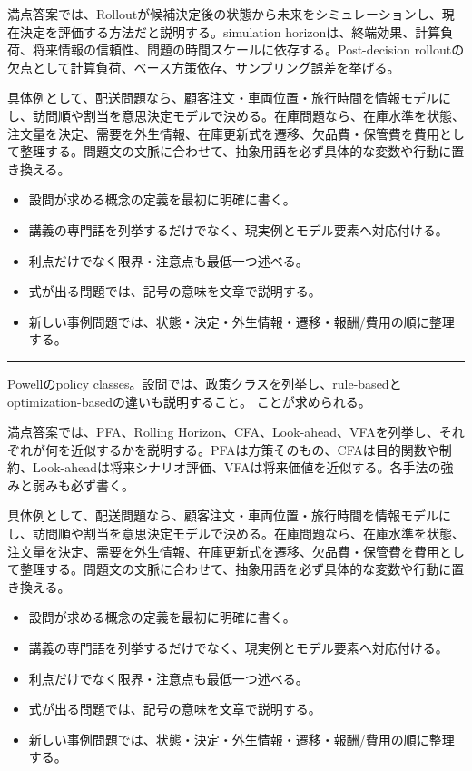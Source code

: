 満点答案では、Rolloutが候補決定後の状態から未来をシミュレーションし、現在決定を評価する方法だと説明する。simulation horizonは、終端効果、計算負荷、将来情報の信頼性、問題の時間スケールに依存する。Post-decision rolloutの欠点として計算負荷、ベース方策依存、サンプリング誤差を挙げる。\par
{}
具体例として、配送問題なら、顧客注文・車両位置・旅行時間を情報モデルにし、訪問順や割当を意思決定モデルで決める。在庫問題なら、在庫水準を状態、注文量を決定、需要を外生情報、在庫更新式を遷移、欠品費・保管費を費用として整理する。問題文の文脈に合わせて、抽象用語を必ず具体的な変数や行動に置き換える。\par
{}
\begin{itemize}
\item 設問が求める概念の定義を最初に明確に書く。
\item 講義の専門語を列挙するだけでなく、現実例とモデル要素へ対応付ける。
\item 利点だけでなく限界・注意点も最低一つ述べる。
\item 式が出る問題では、記号の意味を文章で説明する。
\item 新しい事例問題では、状態・決定・外生情報・遷移・報酬/費用の順に整理する。
\end{itemize}
\vspace{2mm}\hrule\vspace{2mm}
Powellのpolicy classes。設問では、政策クラスを列挙し、rule-basedとoptimization-basedの違いも説明すること。 ことが求められる。\par
{}
満点答案では、PFA、Rolling Horizon、CFA、Look-ahead、VFAを列挙し、それぞれが何を近似するかを説明する。PFAは方策そのもの、CFAは目的関数や制約、Look-aheadは将来シナリオ評価、VFAは将来価値を近似する。各手法の強みと弱みも必ず書く。\par
{}
具体例として、配送問題なら、顧客注文・車両位置・旅行時間を情報モデルにし、訪問順や割当を意思決定モデルで決める。在庫問題なら、在庫水準を状態、注文量を決定、需要を外生情報、在庫更新式を遷移、欠品費・保管費を費用として整理する。問題文の文脈に合わせて、抽象用語を必ず具体的な変数や行動に置き換える。\par
{}
\begin{itemize}
\item 設問が求める概念の定義を最初に明確に書く。
\item 講義の専門語を列挙するだけでなく、現実例とモデル要素へ対応付ける。
\item 利点だけでなく限界・注意点も最低一つ述べる。
\item 式が出る問題では、記号の意味を文章で説明する。
\item 新しい事例問題では、状態・決定・外生情報・遷移・報酬/費用の順に整理する。
\end{itemize}
